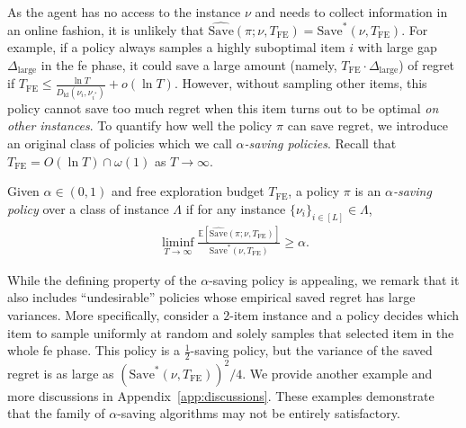 \documentclass[twoside,11pt]{article}
\newcommand{\kl}{D_{\mathrm{kl}}}
\newcommand{\bbE}{\mathbb{E}}
\newcommand{\Tfe}{T_{\mathrm{FE}}}
\newcommand{\Saved}{\mathrm{Save}}
\begin{document}
As the agent has no access to the instance $\nu$ and needs to collect information in an online fashion, it is unlikely that $\widehat{\Saved}(\pi;\nu,\Tfe)=\Saved^*(\nu,\Tfe).$ 
For example, if a policy always samples a highly suboptimal item $i$ with large gap $\Delta_{\mathrm{large}}$ in the \ac{fe} phase, it could save  a large amount (namely, $\Tfe\cdot\Delta_{\mathrm{large}}$) of regret if  $\Tfe\leq \frac{\ln T}{\kl(\nu_i,\nu_{i^*})}  + o(\ln T)$. However, without sampling other items, this policy cannot save too much regret when this item turns out to be optimal {\em on other instances}. To quantify how well the  policy $\pi$ can save  regret, we introduce an original  class of policies which we call {\em $\alpha$-saving policies}.
Recall that $\Tfe=O(\ln T)\cap \omega(1)$ as $T\to\infty$.
\begin{definition}\label{def2}
    Given $\alpha\in(0,1)$ and free exploration budget $\Tfe$,
    a policy $\pi$ is an {\em $\alpha$-saving policy} over a class of instance $\Lambda$ if 
    for any instance $\{\nu_i\}_{i\in[L]}\in\Lambda$,
    \begin{align}\label{equ:alpha_saving}
            \liminf_{T\to\infty}\frac{\bbE[\widehat{\Saved}(\pi;\nu,\Tfe)]}{\Saved^*(\nu,\Tfe) }\geq\alpha.
    \end{align}
\end{definition}
While the defining property of the $\alpha$-saving policy is appealing, we remark that it also includes ``undesirable'' policies whose empirical saved regret has large variances.
More specifically, consider a $2$-item instance and a policy decides which item to sample uniformly at random and solely samples that selected item in the whole \ac{fe} phase. This policy is a $\frac{1}{2}$-saving policy, but the variance of the saved regret is as large as $(\Saved^*(\nu,\Tfe))^2/4 $.
We provide another example and more discussions in Appendix~\ref{app:discussions}.
These examples demonstrate that the family of $\alpha$-saving algorithms may not be entirely satisfactory. 
\end{document}
